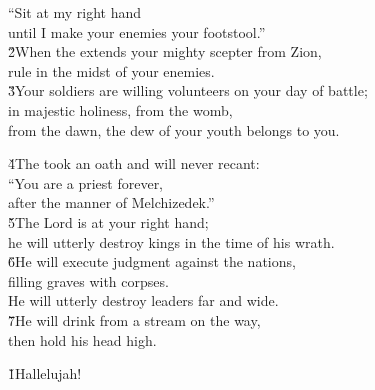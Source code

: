 \begin{poetry}
\poemll    ``Sit at my right hand \\
\poemlll       until I make your enemies your footstool.'' \\
\poeml \v{2}When the  extends your mighty scepter from Zion, \\
\poemll    rule in the midst of your enemies. \\
\poeml \v{3}Your soldiers are willing volunteers on your day of battle; \\
\poemll    in majestic holiness, from the womb, \\
\poemlll       from the dawn, the dew of your youth belongs to you.
\end{poetry}

\begin{poetry}
\poeml \v{4}The  took an oath and will never recant: \\
\poemll    ``You are a priest forever, \\
\poemlll       after the manner of Melchizedek.'' \\
\poeml \v{5}The Lord is at your right hand; \\
\poemll    he will utterly destroy kings in the time of his wrath. \\
\poeml \v{6}He will execute judgment against the nations, \\
\poemll    filling graves with corpses. \\
\poemlll       He will utterly destroy leaders far and wide. \\
\poeml \v{7}He will drink from a stream on the way, \\
\poemll    then hold his head high.
\end{poetry}

\begin{poetry}
\poeml \v{1}Hallelujah!
\end{poetry}

